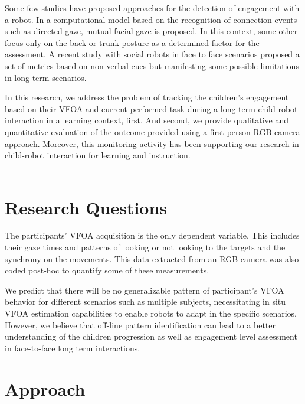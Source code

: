 \documentclass{sig-alternate}
\begin{document}
Some few studies have proposed approaches for the detection of engagement with a robot. In \cite{Rich:2010} a computational model based on the recognition of connection events such
as directed gaze, mutual facial gaze is proposed. In this context, some other \cite{Sanghvi:2011} focus only on the back or trunk posture as a determined factor for the assessment. A recent study \cite{anzalone} with social robots in face to face scenarios proposed a set of metrics based on non-verbal cues but manifesting some possible limitations in long-term scenarios.

In this research, we address the problem of tracking the children's engagement based on their VFOA and current performed task during a long term child-robot interaction in a learning context, first. And second, we provide qualitative and quantitative evaluation of the outcome provided using a first person RGB camera approach. Moreover, this monitoring activity has been supporting our research in child-robot interaction for learning and instruction.
\\\\

\section{Research Questions}

The participants' VFOA acquisition is the only dependent variable. This includes their gaze times and patterns of looking or not looking to the targets and the synchrony on the movements. This data extracted from an RGB camera was also coded post-hoc to quantify some of these measurements.

We predict that there will be no generalizable pattern of participant's VFOA behavior for different scenarios such as multiple subjects, necessitating in situ VFOA estimation capabilities to enable robots to adapt in the specific scenarios. However, we believe that off-line pattern identification can lead to a better understanding of the children progression as well as engagement level assessment in face-to-face long term interactions.

\section{Approach}
\end{document}
